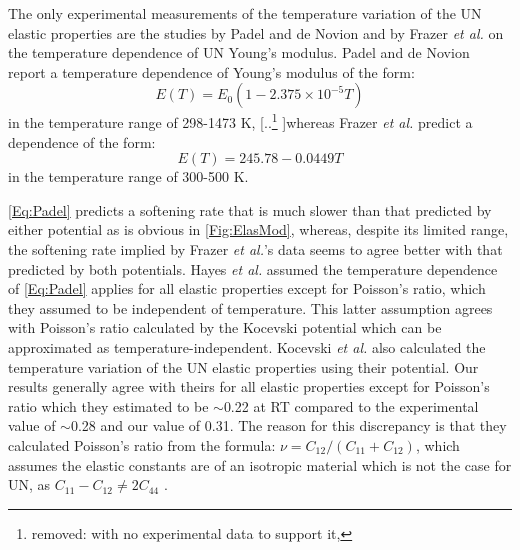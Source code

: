 \documentclass[preprint, 12pt]{elsarticle}
\providecommand{\DIFdeltex}[1]{{\protect\color{red} [..\footnote{removed: #1} ]}} %
\providecommand{\DIFdelbegin}{} %
\providecommand{\DIFdelend}{} %
\providecommand{\DIFdel}[1]{\texorpdfstring{\DIFdeltex{#1}}{}} %
\newcommand{\DIFscaledelfig}{0.5}
\newlength{\DIFdelgraphicswidth} %
\newlength{\DIFdelgraphicsheight} %
\newcommand{\DIFdelincludegraphics}[2][]{%
\sbox{\DIFdelgraphicsbox}{\DIFOincludegraphics[#1]{#2}}%
\settoboxwidth{\DIFdelgraphicswidth}{\DIFdelgraphicsbox} %
\settoboxtotalheight{\DIFdelgraphicsheight}{\DIFdelgraphicsbox} %
\scalebox{\DIFscaledelfig}{%
\parbox[b]{\DIFdelgraphicswidth}{\usebox{\DIFdelgraphicsbox}\\[-\baselineskip] \rule{\DIFdelgraphicswidth}{0em}}\llap{\resizebox{\DIFdelgraphicswidth}{\DIFdelgraphicsheight}{%
\setlength{\unitlength}{\DIFdelgraphicswidth}%
\begin{picture}(1,1)%
\thicklines\linethickness{2pt} %
{\color[rgb]{1,0,0}\put(0,0){\framebox(1,1){}}}%
{\color[rgb]{1,0,0}\put(0,0){\line( 1,1){1}}}%
{\color[rgb]{1,0,0}\put(0,1){\line(1,-1){1}}}%
\end{picture}%
}\hspace*{3pt}}} %
} %
\DeclareRobustCommand{\DIFdelbegin}{\DIFOdelbegin \let\includegraphics\DIFdelincludegraphics} %
\DeclareRobustCommand{\DIFdelend}{\DIFOaddend \let\includegraphics\DIFOincludegraphics} %
\begin{document}
The only experimental measurements of the temperature variation of the UN elastic properties are the studies by Padel and de Novion \cite{Padel1969} and by Frazer \textit{et al.} \cite{Frazer2021} on the temperature dependence of UN Young's modulus. Padel and de Novion \cite{Padel1969} report a temperature dependence of Young's modulus of the form:
\begin{equation}
E(T)= E_0 \left( 1-2.375 \times 10^{-5} T \right)
\label{Eq:Padel}
\end{equation}
in the temperature range of 298-1473 K, \DIFdelbegin \DIFdel{with no experimental data to support it, }\DIFdelend whereas Frazer \textit{et al.} predict a dependence of the form:
\begin{equation}
E(T) = 245.78 - 0.0449 T
\label{Eq:Frazer}
\end{equation}
in the temperature range of 300-500 K.

\cref{Eq:Padel} predicts a softening rate that is much slower than that predicted by either potential as is obvious in \cref{Fig:ElasMod}, whereas, despite its limited range, the softening rate implied by Frazer \textit{et al.}'s data \cite{Frazer2021} seems to agree better with that predicted by both potentials. Hayes \textit{et al.} \cite{Hayes1990II} assumed the temperature dependence of \cref{Eq:Padel} applies for all elastic properties except for Poisson's ratio, which they assumed to be independent of temperature. This latter assumption agrees with Poisson's ratio calculated by the Kocevski potential which can be approximated as temperature-independent. Kocevski \textit{et al.} \cite{Kocevski2022II} also calculated the temperature variation of the UN elastic properties using their potential. Our results generally agree with theirs for all elastic properties except for Poisson's ratio which they estimated to be $\sim$0.22 at RT compared to the experimental value of $\sim$0.28 and our value of 0.31. The reason for this discrepancy is that they calculated Poisson's ratio from the formula: $\nu = C_{12}/\left( C_{11}+C_{12} \right)$, which assumes the elastic constants are of an isotropic material which is not the case for UN, as $C_{11}-C_{12} \neq 2C_{44}$ \cite{Salleh1986, Zener1947}.
\end{document}

